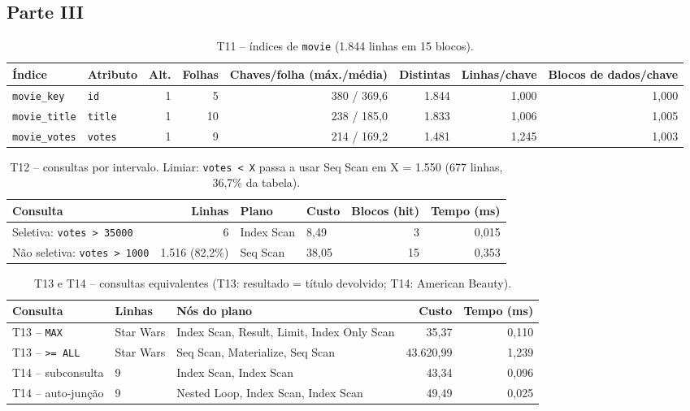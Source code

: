 \documentclass[11pt,a4paper]{article}
\begin{document}
\subsection*{Parte III}
\begin{table}[H]\centering\small
\caption{T11 -- índices de \texttt{movie} (1.844 linhas em 15 blocos).}\label{tab:t11}
\begin{adjustbox}{max width=\linewidth}\begin{tabular}{llrrrrrr}
\toprule
Índice & Atributo & Alt. & Folhas & Chaves/folha (máx./média) & Distintas & Linhas/chave & Blocos de dados/chave \\
\midrule
\texttt{movie\_key} & \texttt{id} & 1 & 5 & 380 / 369,6 & 1.844 & 1,000 & 1,000 \\
\texttt{movie\_title} & \texttt{title} & 1 & 10 & 238 / 185,0 & 1.833 & 1,006 & 1,005 \\
\texttt{movie\_votes} & \texttt{votes} & 1 & 9 & 214 / 169,2 & 1.481 & 1,245 & 1,003 \\
\bottomrule
\end{tabular}\end{adjustbox}
\end{table}
\begin{table}[H]\centering\small
\caption{T12 -- consultas por intervalo. Limiar: \texttt{votes < X} passa a usar Seq Scan em X = 1.550 (677 linhas, 36,7\% da tabela).}\label{tab:t12}
\begin{adjustbox}{max width=\linewidth}\begin{tabular}{lrllrr}
\toprule
Consulta & Linhas & Plano & Custo & Blocos (hit) & Tempo (ms) \\
\midrule
Seletiva: \texttt{votes > 35000} & 6 & Index Scan & 8,49 & 3 & 0,015 \\
Não seletiva: \texttt{votes > 1000} & 1.516 (82,2\%) & Seq Scan & 38,05 & 15 & 0,353 \\
\bottomrule
\end{tabular}\end{adjustbox}
\end{table}
\begin{table}[H]\centering\small
\caption{T13 e T14 -- consultas equivalentes (T13: resultado = título devolvido; T14: American Beauty).}\label{tab:t1314}
\begin{adjustbox}{max width=\linewidth}\begin{tabular}{lllrr}
\toprule
Consulta & Linhas & Nós do plano & Custo & Tempo (ms) \\
\midrule
T13 -- \texttt{MAX} & Star Wars & Index Scan, Result, Limit, Index Only Scan & 35,37 & 0,110 \\
T13 -- \texttt{>= ALL} & Star Wars & Seq Scan, Materialize, Seq Scan & 43.620,99 & 1,239 \\
T14 -- subconsulta & 9 & Index Scan, Index Scan & 43,34 & 0,096 \\
T14 -- auto-junção & 9 & Nested Loop, Index Scan, Index Scan & 49,49 & 0,025 \\
\bottomrule
\end{tabular}\end{adjustbox}
\end{table}
\end{document}

